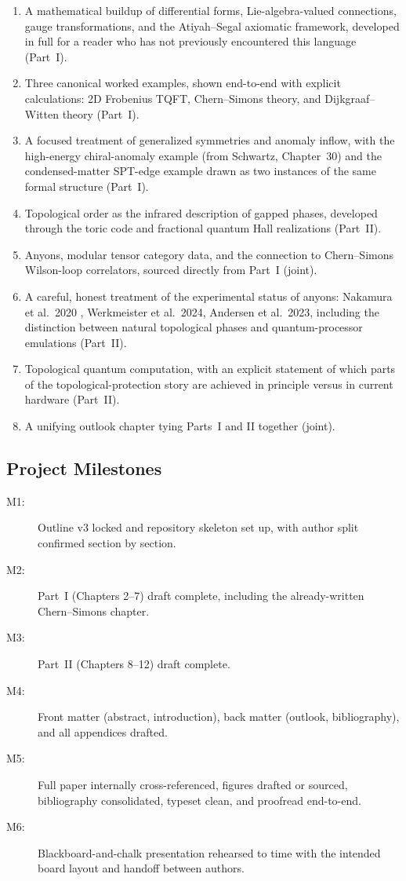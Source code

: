 \documentclass[11pt]{article}
\begin{document}
\begin{enumerate}[label=(\roman*)]
\item A mathematical buildup of differential forms, Lie-algebra-valued connections, gauge
transformations, and the Atiyah--Segal axiomatic framework, developed in full for a
reader who has not previously encountered this language (Part~I).
\item Three canonical worked examples, shown end-to-end with explicit calculations:
2D Frobenius TQFT, Chern--Simons theory, and Dijkgraaf--Witten theory (Part~I).
\item A focused treatment of generalized symmetries and anomaly inflow, with the high-energy
chiral-anomaly example (from Schwartz, Chapter~30) and the condensed-matter SPT-edge
example drawn as two instances of the same formal structure (Part~I).
\item Topological order as the infrared description of gapped phases, developed
through the toric code and fractional quantum Hall realizations (Part~II).
\item Anyons, modular tensor category data, and the connection to Chern--Simons
Wilson-loop correlators, sourced directly from Part~I (joint).
\item A careful, honest treatment of the experimental status of anyons: Nakamura et al.\
2020 \cite{Nakamura2020}, Werkmeister et al.\ 2024, Andersen et al.\ 2023, including
the distinction between natural topological phases and quantum-processor emulations
(Part~II).
\item Topological quantum computation, with an explicit statement of which parts of the
topological-protection story are achieved in principle versus in current hardware (Part~II).
\item A unifying outlook chapter tying Parts~I and II together (joint).
\end{enumerate}

\subsection{Project Milestones}

\begin{description}
\item[M1:] Outline v3 locked and repository skeleton set up, with author split confirmed
section by section.
\item[M2:] Part~I (Chapters 2--7) draft complete, including the already-written
Chern--Simons chapter.
\item[M3:] Part~II (Chapters 8--12) draft complete.
\item[M4:] Front matter (abstract, introduction), back matter (outlook, bibliography),
and all appendices drafted.
\item[M5:] Full paper internally cross-referenced, figures drafted or sourced, bibliography
consolidated, typeset clean, and proofread end-to-end.
\item[M6:] Blackboard-and-chalk presentation rehearsed to time with the intended board
layout and handoff between authors.
\end{description}
\end{document}
